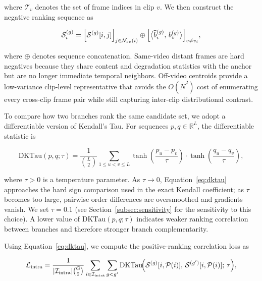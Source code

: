 where $\mathcal{T}_v$ denotes the set of frame indices in clip $v$. We then construct the negative ranking sequence as

\begin{equation}
\bar{\mathcal{S}}_i^{(g)} =
\Bigl[\mathcal{S}^{(g)}[i,j]\Bigr]_{j\in\mathcal{N}_{sv}(i)}
\oplus
\Bigl[\bigl\langle \widehat{b}_i^{(g)},\,\bar{b}_v^{(g)} \bigr\rangle\Bigr]_{v\neq v_i},
\end{equation}

where $\oplus$ denotes sequence concatenation. Same-video distant frames are hard negatives because they share content and degradation statistics with the anchor but are no longer immediate temporal neighbors. Off-video centroids provide a low-variance clip-level representative that avoids the $O(\bar{N}^2)$ cost of enumerating every cross-clip frame pair while still capturing inter-clip distributional contrast.

To compare how two branches rank the same candidate set, we adopt a differentiable version of Kendall's Tau. For sequences $p,q\in\mathbb{R}^{L}$, the differentiable statistic is

\begin{equation}
\mathrm{DKTau}(p,q;\tau)
= \frac{1}{\binom{L}{2}}
\sum_{1\le u < v \le L}
\tanh\!\!\left(\frac{p_u-p_v}{\tau}\right)
\cdot
\tanh\!\!\left(\frac{q_u-q_v}{\tau}\right),
\label{eq:dktau}
\end{equation}

where $\tau>0$ is a temperature parameter. As $\tau\rightarrow 0$, Equation~\eqref{eq:dktau} approaches the hard sign comparison used in the exact Kendall coefficient; as $\tau$ becomes too large, pairwise order differences are oversmoothed and gradients vanish. We set $\tau=0.1$ (see Section~\ref{subsec:sensitivity} for the sensitivity to this choice). A lower value of $\mathrm{DKTau}(p,q;\tau)$ indicates weaker ranking correlation between branches and therefore stronger branch complementarity.

Using Equation~\eqref{eq:dktau}, we compute the positive-ranking correlation loss as

\begin{equation}
\mathcal{L}_{\text{intra}} =
\frac{1}{|\mathcal{I}_{\text{intra}}| \binom{G}{2}}
\sum_{i\in\mathcal{I}_{\text{intra}}}
\sum_{g < g'}
\mathrm{DKTau}\!\Bigl(
\mathcal{S}^{(g)}[i,\mathcal{P}(i)],\,
\mathcal{S}^{(g')}[i,\mathcal{P}(i)];\,\tau
\Bigr),
\label{eq:loss_intra}
\end{equation}

